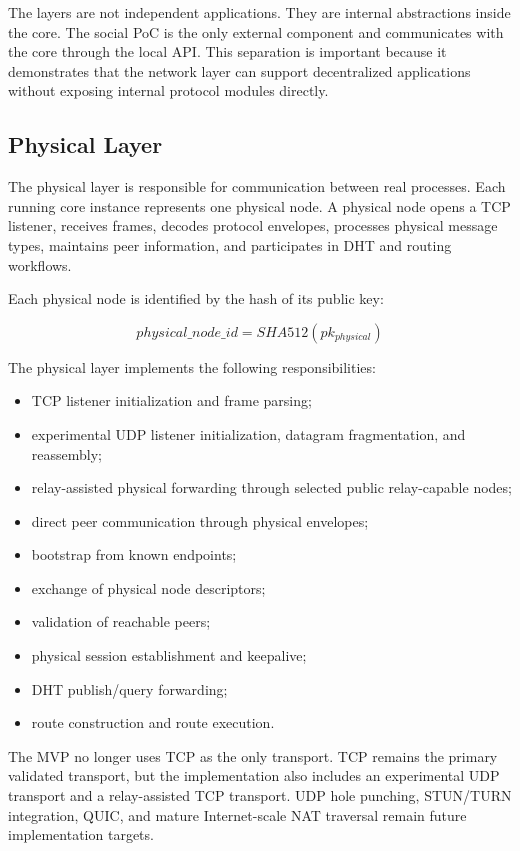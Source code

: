 \documentclass[
  12pt,
  oneside,
  a4paper,
  chapter=TITLE,
  section=TITLE,
  english,
  brazil
]{abntex2}
\begin{document}
The layers are not independent applications. They are internal abstractions inside the core. The social PoC is the only external component and communicates with the core through the local API. This separation is important because it demonstrates that the network layer can support decentralized applications without exposing internal protocol modules directly.

\subsection{Physical Layer}
\label{subsec:physical-layer-implementation}

The physical layer is responsible for communication between real processes. Each running core instance represents one physical node. A physical node opens a TCP listener, receives frames, decodes protocol envelopes, processes physical message types, maintains peer information, and participates in DHT and routing workflows.

Each physical node is identified by the hash of its public key:

\begin{equation}
    physical\_node\_id = SHA512(pk_{physical})
\end{equation}

The physical layer implements the following responsibilities:

\begin{itemize}
    \item TCP listener initialization and frame parsing;
    \item experimental UDP listener initialization, datagram fragmentation, and reassembly;
    \item relay-assisted physical forwarding through selected public relay-capable nodes;
    \item direct peer communication through physical envelopes;
    \item bootstrap from known endpoints;
    \item exchange of physical node descriptors;
    \item validation of reachable peers;
    \item physical session establishment and keepalive;
    \item DHT publish/query forwarding;
    \item route construction and route execution.
\end{itemize}

The MVP no longer uses TCP as the only transport. TCP remains the primary validated transport, but the implementation also includes an experimental UDP transport and a relay-assisted TCP transport. UDP hole punching, STUN/TURN integration, QUIC, and mature Internet-scale NAT traversal remain future implementation targets.
\end{document}
